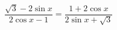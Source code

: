 \begin{ex}[type=prove_identity]
	\begin{condition}
		\( \dfrac{\sqrt{3}-2\sin x}{2\cos x - 1}=\dfrac{1 + 2\cos x}{2\sin x + \sqrt{3}} \)
	\end{condition}
\end{ex}